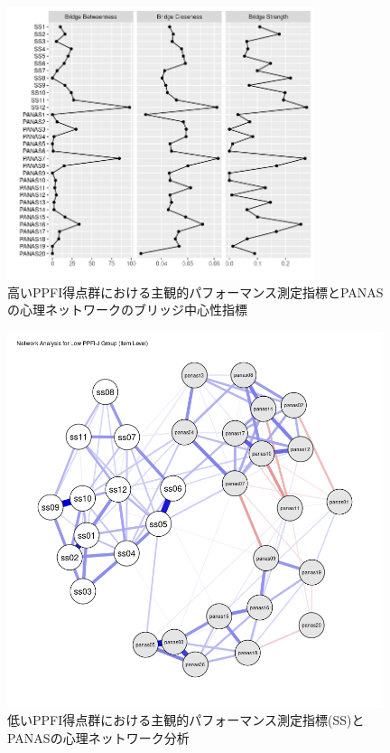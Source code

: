 \documentclass[12pt,a4paper,xelatex,ja=standard]{bxjsarticle}
\begin{document}
\begin{figure}[H]
\centering
\includegraphics[clip,width = 9cm]{High_B.png}
\caption{高いPPFI得点群における主観的パフォーマンス測定指標とPANASの心理ネットワークのブリッジ中心性指標}
\end{figure}

\begin{figure}[H]
\centering
\includegraphics[clip,width = 11cm]{Low_PPFI_J_Network.png}
\caption{低いPPFI得点群における主観的パフォーマンス測定指標(SS)とPANASの心理ネットワーク分析}
\end{figure}
\end{document}
